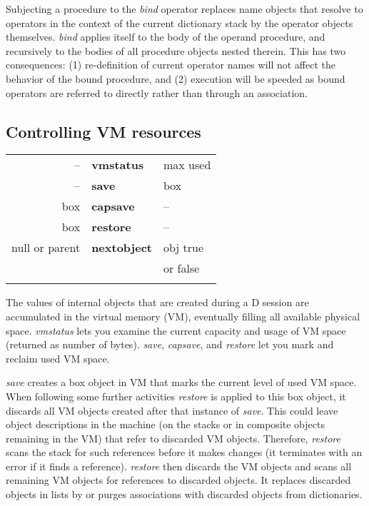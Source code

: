 Subjecting  a procedure to the \emph{bind} operator replaces name  objects  that resolve to operators in the context of the current dictionary stack by the operator  objects  themselves. \emph{bind} applies itself to the  body  of  the operand procedure,  and recursively to the bodies of all procedure objects nested therein.  This has two consequences:  (1) re-definition of  current operator  names will not affect the behavior of the bound  procedure,  and (2) execution will be speeded as bound operators are referred to  directly rather than through an association.

\subsection{Controlling VM resources}

\begin{tabular}{>{\sffamily}r>{\sffamily\bfseries}l>{\sffamily}l}
-- & vmstatus  & max used\\
--             & save       & box\\
box            & capsave    & --\\
box            & restore    & --\\
null or parent & nextobject & obj true\\
               &            & or false\\\\
\end{tabular} 


The  values of internal objects that are created during a D  session  are accumulated  in  the  virtual memory (VM),  eventually  filling  all  available physical space. \emph{vmstatus} lets you examine the current capacity and usage of VM space (returned as number of bytes). \emph{save}, \emph{capsave}, and \emph{restore} let you mark and reclaim used VM space.

\emph{save} creates a box object in VM that marks the current level of
used VM space. When following some further activities \emph{restore}
is applied to this box object, it discards all VM objects created
after that instance of \emph{save}. This could leave object
descriptions in the machine (on the stacks or in composite objects
remaining in the VM) that refer to discarded VM objects. Therefore,
\emph{restore} scans the stack for such references before it makes
changes (it terminates with an error if it finds a
reference). \emph{restore} then discards the VM objects and scans all
remaining VM objects for references to discarded objects. It replaces
discarded objects in lists by  or purges associations with
discarded objects from dictionaries.

